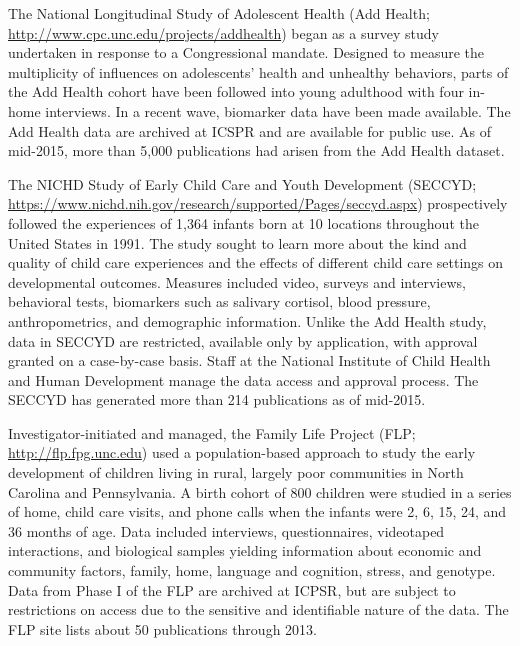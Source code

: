 \documentclass[letterpaper,man,apacite,natbib]{apa6}
\begin{document}
The National Longitudinal Study of Adolescent Health (Add Health; \url{http://www.cpc.unc.edu/projects/addhealth}) began as a survey study undertaken in response to a Congressional mandate. Designed to measure the multiplicity of influences on adolescents' health and unhealthy behaviors, parts of the Add Health cohort have been followed into young adulthood with four in-home interviews.
In a recent wave, biomarker data have been made available. 
The Add Health data are archived at ICSPR and are available for public use.
As of mid-2015, more than 5,000 publications had arisen from the Add Health dataset.

The NICHD Study of Early Child Care and Youth Development (SECCYD; \url{https://www.nichd.nih.gov/research/supported/Pages/seccyd.aspx}) prospectively followed the experiences of 1,364 infants born at 10 locations throughout the United States in 1991.
The study sought to learn more about the kind and quality of child care experiences and the effects of different child care settings on developmental outcomes. 
Measures included video, surveys and interviews, behavioral tests, biomarkers such as salivary cortisol, blood pressure, anthropometrics, and demographic information.
Unlike the Add Health study, data in SECCYD are restricted, available only by application, with approval granted on a case-by-case basis.
Staff at the National Institute of Child Health and Human Development manage the data access and approval process.
The SECCYD has generated more than 214 publications as of mid-2015.

Investigator-initiated and managed, the Family Life Project (FLP; \url{http://flp.fpg.unc.edu}) used a population-based approach to study the early development of children living in rural, largely poor communities in North Carolina and Pennsylvania. 
A birth cohort of 800 children were studied in a series of home, child care visits, and phone calls when the infants were 2, 6, 15, 24, and 36 months of age. 
Data included interviews, questionnaires, videotaped interactions, and biological samples yielding information about economic and community factors, family, home, language and cognition, stress, and genotype.
Data from Phase I of the FLP are archived at ICPSR, but are subject to restrictions on access due to the sensitive and identifiable nature of the data.
The FLP site lists about 50 publications through 2013.
\end{document}
